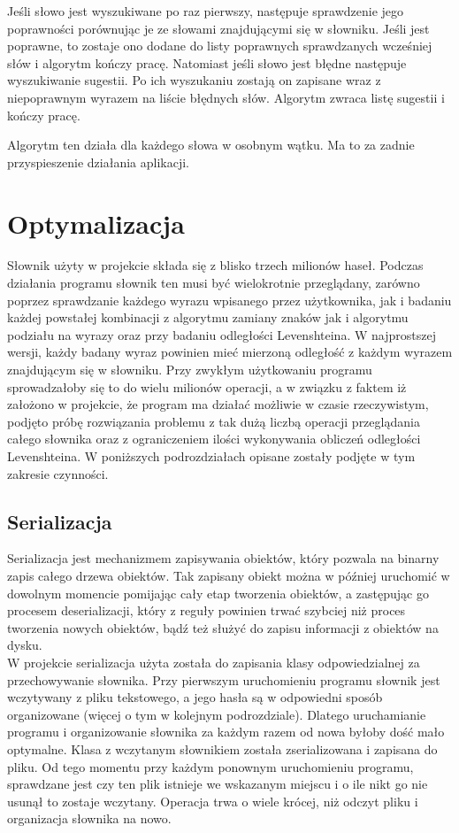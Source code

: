 Jeśli słowo jest wyszukiwane po raz pierwszy, następuje sprawdzenie jego poprawności porównując je ze słowami znajdującymi się w słowniku. Jeśli jest poprawne, to zostaje ono dodane do listy poprawnych sprawdzanych wcześniej słów i algorytm kończy pracę. Natomiast jeśli słowo jest błędne następuje wyszukiwanie sugestii. Po ich wyszukaniu zostają on zapisane wraz z niepoprawnym wyrazem na liście błędnych słów. Algorytm zwraca listę sugestii i kończy pracę.

Algorytm ten działa dla każdego słowa w osobnym wątku. Ma to za zadnie przyspieszenie działania aplikacji.  

\section{Optymalizacja}
\label{chap:optym}
Słownik użyty w projekcie składa się z blisko trzech milionów haseł. Podczas działania programu słownik ten musi być wielokrotnie przeglądany, zarówno poprzez sprawdzanie każdego wyrazu wpisanego przez użytkownika, jak i badaniu każdej powstałej kombinacji z algorytmu zamiany znaków jak i algorytmu podziału na wyrazy oraz przy badaniu odległości Levenshteina. W najprostszej wersji, każdy badany wyraz powinien mieć mierzoną odległość z każdym wyrazem znajdującym się w słowniku. Przy zwykłym użytkowaniu programu sprowadzałoby się to do wielu milionów operacji, a w związku z faktem iż założono w projekcie, że program ma działać możliwie w czasie rzeczywistym, podjęto próbę rozwiązania problemu z tak dużą liczbą operacji przeglądania całego słownika oraz z ograniczeniem ilości wykonywania obliczeń odległości Levenshteina. W poniższych podrozdziałach opisane zostały podjęte w tym zakresie czynności.

\subsection{Serializacja}
Serializacja jest mechanizmem zapisywania obiektów, który pozwala na binarny zapis całego drzewa obiektów. Tak zapisany obiekt można w później uruchomić w dowolnym momencie pomijając cały etap tworzenia obiektów, a zastępując go procesem deserializacji, który z reguły powinien trwać szybciej niż proces tworzenia nowych obiektów, bądź też służyć do zapisu informacji z obiektów na dysku.\\

W projekcie serializacja użyta została do zapisania klasy odpowiedzialnej za przechowywanie słownika. Przy pierwszym uruchomieniu programu słownik jest wczytywany z pliku tekstowego, a jego hasła są w odpowiedni sposób organizowane (więcej o tym w kolejnym podrozdziale). Dlatego uruchamianie programu i organizowanie słownika za każdym razem od nowa byłoby dość mało optymalne. Klasa z wczytanym słownikiem została zserializowana i zapisana do pliku. Od tego momentu przy każdym ponownym uruchomieniu programu, sprawdzane jest czy ten plik istnieje we wskazanym miejscu i o ile nikt go nie usunął to zostaje wczytany. Operacja trwa o wiele krócej, niż odczyt pliku i organizacja słownika na nowo. \\

